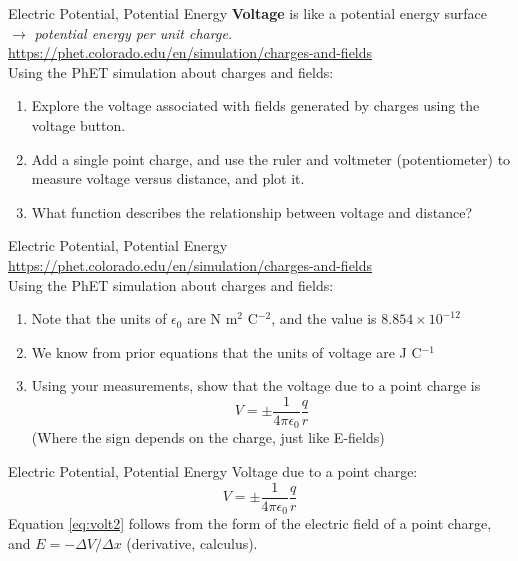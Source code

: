 \documentclass{beamer}
\begin{document}
\begin{frame}{Electric Potential, Potential Energy}
\textbf{Voltage} is like a potential energy surface $\rightarrow$ \textit{potential energy per unit charge.} \\ \vspace{0.5cm}
\url{https://phet.colorado.edu/en/simulation/charges-and-fields} \\
\alert{Using the PhET simulation about charges and fields}:
\begin{enumerate}
\item Explore the voltage associated with fields generated by charges using the voltage button.
\item Add a single point charge, and use the ruler and voltmeter (potentiometer) to measure voltage versus distance, and plot it.
\item What function describes the relationship between voltage and distance?
\end{enumerate}
\end{frame}

\begin{frame}{Electric Potential, Potential Energy}
\url{https://phet.colorado.edu/en/simulation/charges-and-fields} \\
\alert{Using the PhET simulation about charges and fields}:
\begin{enumerate}
\item Note that the units of $\epsilon_0$ are N m$^2$ C$^{-2}$, and the value is $8.854\times 10^{-12}$
\item We know from prior equations that the units of voltage are J C$^{-1}$
\item Using your measurements, show that the voltage due to a point charge is
\begin{equation}
\boxed{
V = \pm \frac{1}{4\pi \epsilon_0} \frac{q}{r}}
\end{equation}
(Where the sign depends on the charge, just like E-fields)
\end{enumerate}
\end{frame}

\begin{frame}{Electric Potential, Potential Energy}
Voltage due to a point charge:
\begin{equation}
\boxed{
V = \pm \frac{1}{4\pi \epsilon_0} \frac{q}{r}} \label{eq:volt2}
\end{equation}
Equation \ref{eq:volt2} follows from the form of the electric field of a point charge, and $E = -\Delta V/\Delta x$ (derivative, calculus).
\end{frame}
\end{document}

